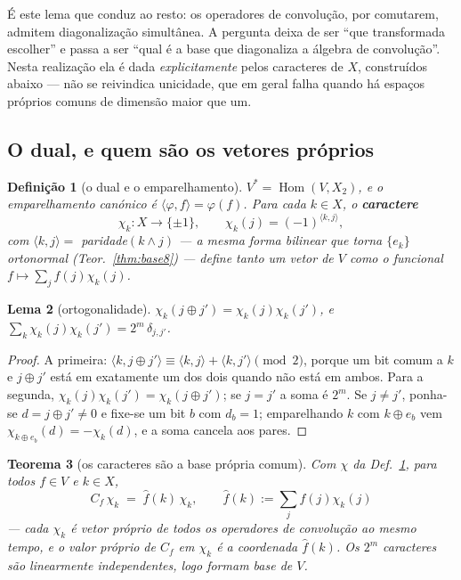 \documentclass[11pt,a4paper]{article}
\newcommand{\Zc}{\ensuremath{X_2}}
\newtheorem{teorema}{Teorema}
\newtheorem{lema}[teorema]{Lema}
\newtheorem{definicao}[teorema]{Definição}
\begin{document}
\medskip\noindent É este lema que conduz ao resto: os operadores de convolução,
por comutarem, admitem diagonalização simultânea. A pergunta deixa de ser ``que
transformada escolher'' e passa a ser ``qual é a base que diagonaliza a álgebra
de convolução''. Nesta realização ela é dada \emph{explicitamente} pelos
caracteres de $X$, construídos abaixo --- não se reivindica unicidade, que em
geral falha quando há espaços próprios comuns de dimensão maior que um.

\subsection*{O dual, e quem são os vetores próprios}

\begin{definicao}[o dual e o emparelhamento]\label{def:dual}
$V^{*}=\operatorname{Hom}(V,\Zc)$, e o emparelhamento canónico é
$\langle\varphi,f\rangle=\varphi(f)$. Para cada $k\in X$, o \textbf{caractere}
\[
\chi_k\colon X\to\{\pm1\},\qquad \chi_k(j)=(-1)^{\langle k,j\rangle},
\]
com $\langle k,j\rangle=$ paridade$(k\wedge j)$ --- a mesma forma bilinear que
torna $\{e_k\}$ ortonormal (Teor.~\ref{thm:base8}) --- define tanto um
\emph{vetor} de $V$ como o \emph{funcional} $f\mapsto\sum_j f(j)\chi_k(j)$.
\end{definicao}

\begin{lema}[ortogonalidade]\label{lem:orto}
$\chi_k(j\oplus j')=\chi_k(j)\chi_k(j')$, e
$\sum_k \chi_k(j)\chi_k(j')=2^{m}\,\delta_{j,j'}$.
\end{lema}

\begin{proof}
A primeira: $\langle k,j\oplus j'\rangle\equiv\langle k,j\rangle+\langle k,j'\rangle
\pmod 2$, porque um bit comum a $k$ e $j\oplus j'$ está em exatamente um dos dois
quando não está em ambos. Para a segunda, $\chi_k(j)\chi_k(j')=\chi_k(j\oplus j')$;
se $j=j'$ a soma é $2^{m}$. Se $j\neq j'$, ponha-se $d=j\oplus j'\neq0$ e fixe-se um
bit $b$ com $d_b=1$; emparelhando $k$ com $k\oplus e_b$ vem
$\chi_{k\oplus e_b}(d)=-\chi_k(d)$, e a soma cancela aos pares.
\end{proof}

\begin{teorema}[os caracteres são a base própria comum]\label{thm:proprios}
Com $\chi$ da Def.~\ref{def:dual}, para todos $f\in V$ e $k\in X$,
\[
\boxed{\;C_f\,\chi_k \;=\; \widehat{f}(k)\,\chi_k,\qquad
\widehat{f}(k):=\sum_j f(j)\chi_k(j)\;}
\]
--- cada $\chi_k$ é vetor próprio de \emph{todos} os operadores de convolução ao
mesmo tempo, e o valor próprio de $C_f$ em $\chi_k$ é a coordenada
$\widehat{f}(k)$. Os $2^{m}$ caracteres são linearmente independentes, logo formam
base de $V$.
\end{teorema}
\end{document}
